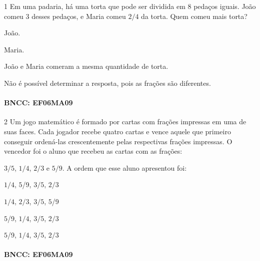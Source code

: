 
\num{1}  Em uma padaria, há uma torta que pode ser dividida em $8$ pedaços
iguais. João comeu $3$ desses pedaços, e Maria comeu $2/4$ da torta. Quem
comeu mais torta?

\begin{escolha}
\item João.
\item Maria.
\item João e Maria comeram a mesma quantidade de torta.
\item Não é possível determinar a resposta, pois as frações são diferentes.
\end{escolha}


\paragraph{BNCC: EF06MA09 }


\num{2}  Um jogo matemático é formado por cartas com frações impressas em uma
de suas faces. Cada jogador recebe quatro cartas e vence aquele que
primeiro conseguir ordená-las crescentemente pelas respectivas frações
impressas. O vencedor foi o aluno que recebeu as cartas com as frações:

$3/5$, $1/4$, $2/3$ e $5/9$. A ordem que esse aluno apresentou foi:

\begin{escolha}
\item $1/4$, $5$/9, $3/5$, $2/3$
\item $1/4$, $2/3$, $3/5$, $5$/9
\item $5$/9, $1/4$, $3/5$, $2/3$
\item $5$/9, $1/4$, $3/5$, $2/3$
\end{escolha}

\paragraph{BNCC: EF06MA09 }

